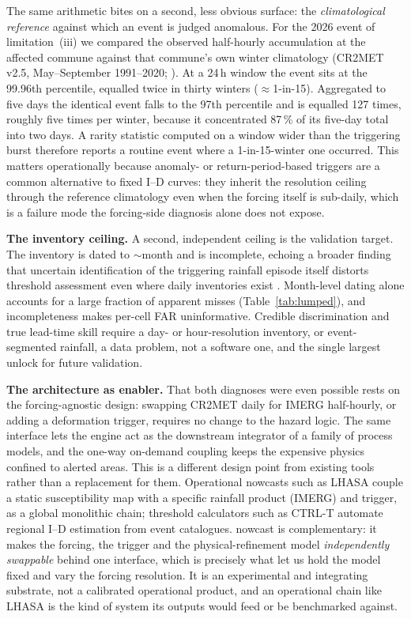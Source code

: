 \documentclass[authoryear,preprint,review,12pt]{elsarticle}
\begin{document}
The same arithmetic bites on a second, less obvious surface: the
\emph{climatological reference} against which an event is judged anomalous. For
the 2026 event of limitation~(iii) we compared the observed half-hourly
accumulation at the affected commune against that commune's own winter
climatology (CR2MET v2.5, May--September 1991--2020; \citealp{boisier2018cr2met}). At a 24\,h window the event sits
at the 99.96th percentile, equalled twice in thirty winters ($\approx$1-in-15).
Aggregated to five days the identical event falls to the 97th percentile and is
equalled 127 times, roughly five times per winter, because it concentrated 87\,\%
of its five-day total into two days. A rarity statistic computed on a window
wider than the triggering burst therefore reports a routine event where a
1-in-15-winter one occurred. This matters operationally because anomaly- or
return-period-based triggers are a common alternative to fixed I--D curves: they
inherit the resolution ceiling through the reference climatology even when the
forcing itself is sub-daily, which is a failure mode the forcing-side diagnosis
alone does not expose.

\textbf{The inventory ceiling.} A second, independent ceiling is the validation
target. The inventory is dated to $\sim$month and is incomplete, echoing a
broader finding that uncertain identification of the triggering rainfall episode
itself distorts threshold assessment even where daily inventories exist
\citep{peres2018}. Month-level
dating alone accounts for a large fraction of apparent misses
(Table~\ref{tab:lumped}), and incompleteness makes per-cell FAR uninformative.
Credible discrimination and true lead-time skill require a day- or hour-resolution
inventory, or event-segmented rainfall, a data problem, not a software one, and
the single largest unlock for future validation.

\textbf{The architecture as enabler.} That both diagnoses were even possible rests
on the forcing-agnostic design: swapping CR2MET daily for IMERG half-hourly, or
adding a deformation trigger, requires no change to the hazard logic. The same
interface lets the engine act as the downstream integrator of a family of process
models, and the one-way on-demand coupling keeps the expensive physics confined to
alerted areas. This is a different design point from existing tools rather than a
replacement for them. Operational nowcasts such as LHASA \citep{kirschbaum2018,
stanley2021} couple a static susceptibility map with a specific rainfall product
(IMERG) and trigger, as a global monolithic chain; threshold calculators such as
CTRL-T \citep{melillo2018} automate regional I--D estimation from event catalogues.
nowcast is complementary: it makes the forcing, the trigger and the
physical-refinement model \emph{independently swappable} behind one interface, which
is precisely what let us hold the model fixed and vary the forcing resolution. It is
an experimental and integrating substrate, not a calibrated operational product, and
an operational chain like LHASA is the kind of system its outputs would feed or be
benchmarked against.
\end{document}

